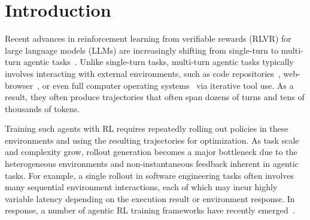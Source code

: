 \section{Introduction}
Recent advances in reinforcement learning from verifiable rewards (RLVR) for large language models (LLMs) are increasingly shifting from single-turn to multi-turn agentic tasks~\citep{guo2025deepseek, hu2025openreasonerzero, cao2025skyrl, luo2025deepswe, gao2025beyond}.
Unlike single-turn tasks, multi-turn agentic tasks typically involves interacting with external environments, such as code repositories~\citep{jimenez2023swe}, web-browser~\citep{zhou2023webarena}, or even full computer operating systems~\citep{xie2024osworld} via iterative tool use. As a result, they often produce trajectories that often span dozens of turns and tens of thousands of tokens.

Training such agents with RL requires repeatedly rolling out policies in these environments and using the resulting trajectories for optimization. As task scale and complexity grow, rollout generation becomes a major bottleneck due to the heterogeneous environments and non-instantaneous feedback inherent in agentic tasks. 
For example, a single rollout in software engineering tasks often involves many sequential environment interactions, each of which may incur highly variable latency depending on the execution result or environment response.
In response, a number of agentic RL training frameworks have recently emerged~\citep{cao2025skyrlagent,jiang2025verltool,tan2025rllm,sheng2025verl,luo2025agentlightning,liu2025gem, xi2026agentgymrl}.

